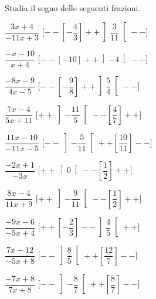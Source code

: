 \begin{esercizio}\label{ese:dis_7}
 Studia il segno delle seguenti frazioni.
\begin{multicols}{2}
 \begin{enumeratea}
  \item  \(\dfrac{3 x +4}{-11 x +3}\) \hfill 
  [\(--\left [-\dfrac{4}{3} \right ]++\left ]\dfrac{3}{11} \right [--\)]
  \item  \(\dfrac{- x -10}{x +4}\) \hfill 
  [\(--\left [-10 \right ]++\left ]-4 \right [--\)]
  \item  \(\dfrac{-8 x -9}{4 x -5}\) \hfill 
  [\(--\left [-\dfrac{9}{8} \right ]++\left ]\dfrac{5}{4} \right [--\)]
  \item  \(\dfrac{7 x -4}{5 x +11}\) \hfill 
  [\(++\left ]-\dfrac{11}{5} \right [--\left [\dfrac{4}{7} \right ]++\)]
  \item  \(\dfrac{11 x -10}{-11 x -5}\) \hfill 
  [\(--\left ]-\dfrac{5}{11} \right [++\left [\dfrac{10}{11} \right ]--\)]
  \item  \(\dfrac{-2 x +1}{-3 x }\) \hfill 
  [\(++\left ]0 \right [--\left [\dfrac{1}{2} \right ]++\)]
  \item  \(\dfrac{8 x -4}{11 x +9}\) \hfill 
  [\(++\left ]-\dfrac{9}{11} \right [--\left [\dfrac{1}{2} \right ]++\)]
  \item  \(\dfrac{-9 x -6}{-5 x +4}\) \hfill 
  [\(++\left [-\dfrac{2}{3} \right ]--\left ]\dfrac{4}{5} \right [++\)]
  \item  \(\dfrac{7 x -12}{-5 x +8}\) \hfill 
  [\(--\left ]\dfrac{8}{5} \right [++\left [\dfrac{12}{7} \right ]--\)]
  \item  \(\dfrac{-7 x +8}{7 x +8}\) \hfill 
  [\(--\left ]-\dfrac{8}{7} \right [++\left [\dfrac{8}{7} \right ]--\)]
 \end{enumeratea}
\end{multicols}
\end{esercizio}

